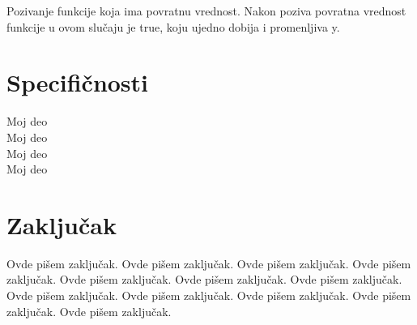 \documentclass[a4paper]{article}
\begin{document}
Pozivanje funkcije koja ima povratnu vrednost. Nakon poziva povratna vrednost funkcije u ovom slučaju je true, koju ujedno dobija i promenljiva y.\\






\section{Specifičnosti}	
\label{sec:sedmiDeo}


Moj deo \\
Moj deo \\
Moj deo \\
Moj deo \\




\section{Zaključak}
\label{sec:zakljucak}

Ovde pišem zaključak. 
Ovde pišem zaključak. 
Ovde pišem zaključak. 
Ovde pišem zaključak. 
Ovde pišem zaključak. 
Ovde pišem zaključak. 
Ovde pišem zaključak. 
Ovde pišem zaključak. 
Ovde pišem zaključak. 
Ovde pišem zaključak. 
Ovde pišem zaključak. 
Ovde pišem zaključak. 


\appendix
 


\appendix
\end{document}
